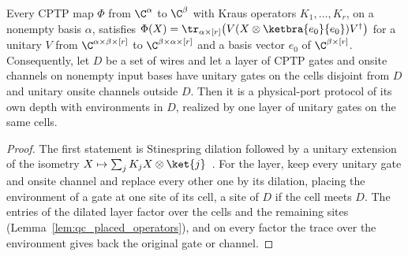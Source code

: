 \begin{lemma}
    \label{thm:qc_fresh_onsite_unitary_dilation}
    \leanok
    Every CPTP map $\Phi$ from $\C^\alpha$ to $\C^\beta$ with Kraus operators
    $K_1,\dots,K_r$, on a nonempty basis $\alpha$, satisfies
    $\Phi(X)=\tr_{\alpha\times[r]}\bigl(V(X\otimes\ketbra{e_0}{e_0})V^\dagger\bigr)$ for a
    unitary $V$ from $\C^{\alpha\times\beta\times[r]}$ to $\C^{\beta\times\alpha\times[r]}$ and a
    basis vector $e_0$ of $\C^{\beta\times[r]}$. Consequently, let $D$ be a set of wires and let
    a layer of CPTP gates and onsite channels on nonempty input bases have unitary gates on the
    cells disjoint from $D$ and unitary onsite channels outside $D$. Then it is a physical-port
    protocol of its own depth with environments in $D$, realized by one layer of unitary gates
    on the same cells.
\end{lemma}
\begin{proof}\leanok
    The first statement is Stinespring dilation followed by a unitary extension of the isometry
    $X\mapsto\sum_jK_jX\otimes\ket{j}$~\cite[Theorems~2.2 and~2.5]{Wolf2012Quantum}. For the
    layer, keep every unitary gate and onsite channel and replace every other one by its
    dilation, placing the environment of a gate at one site of its cell, a site of $D$ if the
    cell meets $D$. The entries of the dilated layer factor over the cells and the remaining
    sites (Lemma~\ref{lem:qc_placed_operators}), and on every factor the trace over the
    environment gives back the original gate or channel.
\end{proof}

